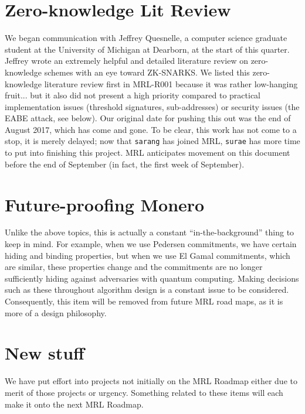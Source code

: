 \documentclass[12pt,english]{mrl}
\theoremstyle{definition}
\numberwithin{equation}{section}
\numberwithin{figure}{section}
\numberwithin{equation}{section}
\numberwithin{equation}{section}
\numberwithin{figure}{section}
\begin{document}
    
\section{Zero-knowledge Lit Review} 

We began communication with Jeffrey Quesnelle, a computer science graduate student at the University of Michigan at Dearborn, at the start of this quarter. Jeffrey wrote an extremely helpful and detailed literature review on zero-knowledge schemes with an eye toward ZK-SNARKS. We listed this zero-knowledge literature review first in MRL-R001 because it was rather low-hanging fruit... but it also did not present a high priority compared to practical implementation issues (threshold signatures, sub-addresses) or security issues (the EABE attack, see below). Our original date for pushing this out was the end of August 2017, which has come and gone. To be clear, this work has not come to a stop, it is merely delayed; now that \texttt{sarang} has joined MRL, \texttt{surae} has more time to put into finishing this project. MRL anticipates movement on this document before the end of September (in fact, the first week of September).
    
    
\section{Future-proofing Monero} 

Unlike the above topics, this is actually a constant ``in-the-background'' thing to keep in mind. For example, when we use Pedersen commitments, we have certain hiding and binding properties, but when we use El Gamal commitments, which are similar, these properties change and the commitments are no longer sufficiently hiding against adversaries with quantum computing. Making decisions such as these throughout algorithm design is a constant issue to be considered. Consequently, this item will be removed from future MRL road maps, as it is more of a design philosophy.
    
\section{New stuff}

We have put effort into projects not initially on the MRL Roadmap either due to merit of those projects or urgency. Something related to these items will each make it onto the next MRL Roadmap.
\end{document}
